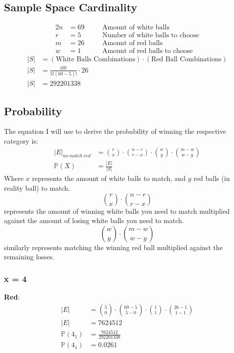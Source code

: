 \documentclass{article}
\begin{document}
\subsection{Sample Space Cardinality}

\begin{alignat*}{2}
	n & = 69 & \quad & \text{Amount of white balls}           \\
	r & = 5  & \quad & \text{Number of white balls to choose} \\
	m & = 26 & \quad & \text{Amount of red balls}             \\
	w & = 1  & \quad & \text{Amount of red balls to choose}
\end{alignat*}
\begin{align*}
	|S| & = (\text{White Balls Combinations}) \cdot (\text{Red Ball Combinations}) \\
	|S| & = \frac{ 69! }{ 5!(69 - 5)! } \cdot 26                                   \\
	|S| & = 292201338
\end{align*}

\subsection{Probability}

The equation I will use to derive the probability of winning the respective category is:
\begin{align*}
	|E|_{no\ match\ red} & = \binom{r}{x} \cdot \binom{n - r}{r - x} \cdot \binom{w}{y} \cdot \binom{m - w}{w - y} \\
	\mathbb{P}(X)        & = \frac{ |E| }{ |S| }
\end{align*}
Where $ x $ represents the amount of white balls to match, and $ y $ red balls (in reality ball) to match.
\[ \binom{r}{x} \cdot \binom{n - r}{r - x} \] represents the amount of winning white balls you need to match multiplied against the amount of losing white balls you need to match.
\[ \binom{w}{y} \cdot \binom{m - w}{w - y} \] similarly represents matching the winning red ball multiplied against the remaining losses.

\subsubsection{x = 4}

\textbf{Red}:
\begin{align*}
	|E|             & = \binom{5}{0} \cdot \binom{69 - 5}{5 - 0} \cdot \binom{1}{1} \cdot \binom{26 - 1}{1 - 1} \\
	|E|             & = 7624512                                                                                 \\
	\mathbb{P}(4_1) & = \frac{ 7624512 }{ 292201338 }                                                           \\
	\mathbb{P}(4_1) & = 0.0261
\end{align*}
\end{document}
